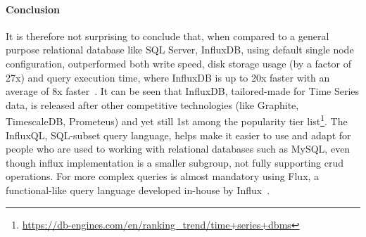 \paragraph{Conclusion}
It is therefore not surprising to conclude that, when compared to a general purpose relational database like SQL Server, InfluxDB, using default single node configuration, 
outperformed both write speed, disk storage usage (by a factor of 27x) and query execution time, where InfluxDB is up to 20x faster with an average of 8x faster~\cite{Misc:noor_2017_universit}.
It can be seen that InfluxDB, tailored-made for Time Series data, is released after other competitive technologies (like Graphite, TimescaleDB, Prometeus) and yet still 1st among the popularity tier list\footnote{\url{https://db-engines.com/en/ranking_trend/time+series+dbms}}.
The InfluxQL, SQL-subset query language, helps make it easier to use and adapt for people who are used to working with relational databases such as MySQL, even though influx
implementation is a smaller subgroup, not fully supporting \ac{crud} operations. For more complex queries is almost mandatory using Flux, a functional-like query language developed in-house by Influx~\cite{Misc:influx_docs}.
